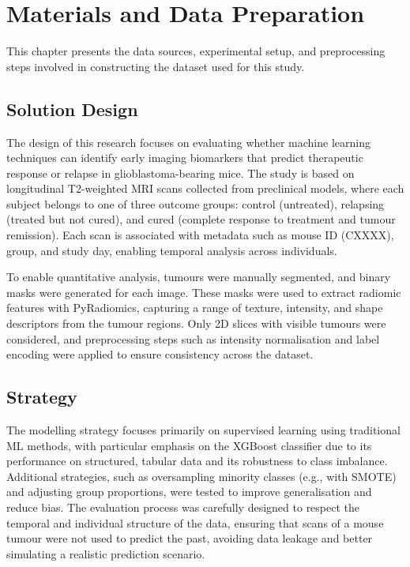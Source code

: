 \documentclass[12pt, a4paper]{report}
\begin{document}
\chapter{Materials and Data Preparation}

This chapter presents the data sources, experimental setup, and preprocessing steps involved in constructing the dataset used for this study.

\section{Solution Design}

The design of this research focuses on evaluating whether machine learning techniques can identify early imaging biomarkers that predict therapeutic response or relapse in glioblastoma-bearing mice. The study is based on longitudinal T2-weighted MRI scans collected from preclinical models, where each subject belongs to one of three outcome groups: control (untreated), relapsing (treated but not cured), and cured (complete response to treatment and tumour remission). Each scan is associated with metadata such as mouse ID (CXXXX), group, and study day, enabling temporal analysis across individuals.

To enable quantitative analysis, tumours were manually segmented, and binary masks were generated for each image. These masks were used to extract radiomic features with PyRadiomics, capturing a range of texture, intensity, and shape descriptors from the tumour regions. Only 2D slices with visible tumours were considered, and preprocessing steps such as intensity normalisation and label encoding were applied to ensure consistency across the dataset.

\section{Strategy}
The modelling strategy focuses primarily on supervised learning using traditional ML methods, with particular emphasis on the XGBoost classifier due to its performance on structured, tabular data and its robustness to class imbalance. Additional strategies, such as oversampling minority classes (e.g., with SMOTE) and adjusting group proportions, were tested to improve generalisation and reduce bias. The evaluation process was carefully designed to respect the temporal and individual structure of the data, ensuring that scans of a mouse tumour were not used to predict the past, avoiding data leakage and better simulating a realistic prediction scenario.
\end{document}
